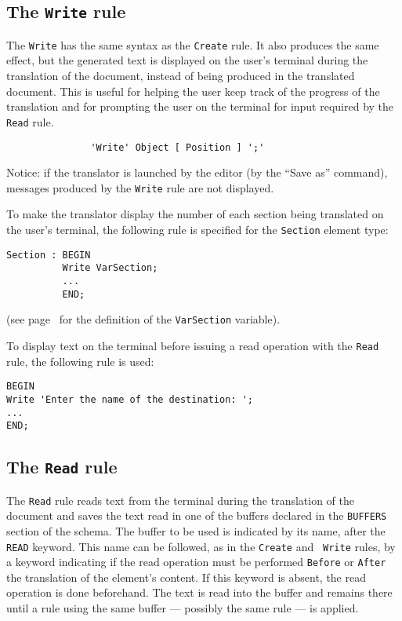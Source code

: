 \subsection{The {\tt Write} rule}
\label{writerule}

The {\tt Write} has the same syntax as the {\tt Create} rule.  It also
produces the same effect, but the generated text is displayed on the
user's terminal during the translation of the document, instead of
being produced in the translated document.  This is useful for helping
the user keep track of the progress of the translation and for
prompting the user on the terminal for input required by the {\tt
Read} rule.

\begin{verbatim}
               'Write' Object [ Position ] ';'
\end{verbatim}

Notice: if the translator is launched by the editor (by the ``Save as''
command), messages produced by the {\tt Write} rule are not displayed.

\begin{example}
To make the translator display the number of each section being
translated on the user's terminal, the following rule is specified for
the {\tt Section} element type:
\begin{verbatim}
Section : BEGIN
          Write VarSection;
          ...
          END;
\end{verbatim}
(see page~\pageref{varsect} for the definition of the {\tt VarSection}
variable).

To display text on the terminal before issuing a read operation with
the {\tt Read} rule, the following rule is used:
\begin{verbatim}
BEGIN
Write 'Enter the name of the destination: ';
...
END;
\end{verbatim}
\end{example}

\subsection{The {\tt Read} rule}
\label{readrule}

The {\tt Read} rule reads text from the terminal during the
translation of the document and saves the text read in one of the
buffers declared in the {\tt BUFFERS} section of the schema.  The
buffer to be used is indicated by its name, after the {\tt READ}
keyword.  This name can be followed, as in the {\tt Create} and {\tt
Write} rules, by a keyword indicating if the read operation must be
performed {\tt Before} or {\tt After} the translation of the element's
content.  If this keyword is absent, the read operation is done
beforehand.  The text is read into the buffer and remains there until
a rule using the same buffer --- possibly the same rule --- is
applied.


